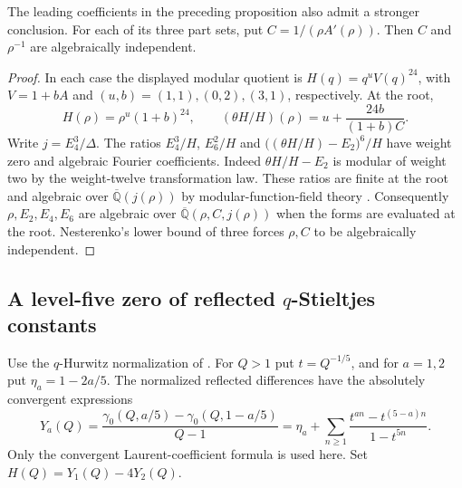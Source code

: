 \documentclass[11pt,a4paper]{article}
\theoremstyle{definition}
\theoremstyle{remark}
\begin{document}
The leading coefficients in the preceding proposition also admit a stronger
conclusion. For each of its three part sets, put $C=1/(\rho A'(\rho))$.
Then $C$ and $\rho^{-1}$ are algebraically independent.

\begin{proof}
In each case the displayed modular quotient is $H(q)=q^uV(q)^{24}$, with
$V=1+bA$ and $(u,b)=(1,1),(0,2),(3,1)$, respectively. At the root,
\[
 H(\rho)=\rho^u(1+b)^{24},\qquad
 (\theta H/H)(\rho)=u+\frac{24b}{(1+b)C}.
\]
Write $j=E_4^3/\Delta$. The ratios $E_4^3/H$, $E_6^2/H$ and
$\big((\theta H/H)-E_2\big)^6/H$ have weight zero and algebraic
Fourier coefficients. Indeed $\theta H/H-E_2$ is modular of weight two
by the weight-twelve transformation law. These ratios are finite at the root
and algebraic over $\overline{\mathbb Q}(j(\rho))$ by modular-function-field
theory \cite[Theorem~2.11]{mBhowmik}. Consequently
$\rho,E_2,E_4,E_6$ are algebraic over $\overline{\mathbb Q}(\rho,C,j(\rho))$
when the forms are evaluated at the root. Nesterenko's lower bound of three
forces $\rho,C$ to be algebraically independent.
\end{proof}

\subsection{A level-five zero of reflected \(q\)-Stieltjes constants}

Use the $q$-Hurwitz normalization of \cite[formula~(7)]{nCG}.
For $Q>1$ put $t=Q^{-1/5}$, and for $a=1,2$ put $\eta_a=1-2a/5$. The
normalized reflected differences have the absolutely convergent expressions
\[
 Y_a(Q)=
 \frac{\gamma_0(Q,a/5)-\gamma_0(Q,1-a/5)}{Q-1}
 =\eta_a+\sum_{n\ge1}\frac{t^{an}-t^{(5-a)n}}{1-t^{5n}} .
\]
Only the convergent Laurent-coefficient formula is used here. Set
$H(Q)=Y_1(Q)-4Y_2(Q)$.
\end{document}
